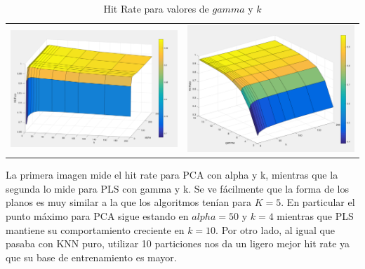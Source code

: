 \begin{table}[h!]
\begin{center}
\begin{tabular}{c c}
	\includegraphics[scale=0.3]{exp2/PCA-10-partitions.png} &
	\includegraphics[scale=0.3]{exp2/PLS-10-partitions.png}\\
\end{tabular}
\end{center}
\caption{Hit Rate para valores de $gamma$ y $k$}
\end{table}

La primera imagen mide el hit rate para PCA con alpha y k, mientras que la segunda lo mide para PLS con gamma y k. Se ve fácilmente que la forma de los planos es muy similar a la que los algoritmos tenían para $K = 5$. En particular el punto máximo para PCA sigue estando en $alpha = 50$ y $k = 4$ mientras que PLS mantiene su comportamiento creciente en $k = 10$.
Por otro lado, al igual que pasaba con KNN puro, utilizar 10 particiones nos da un ligero mejor hit rate ya que su base de entrenamiento es mayor.







